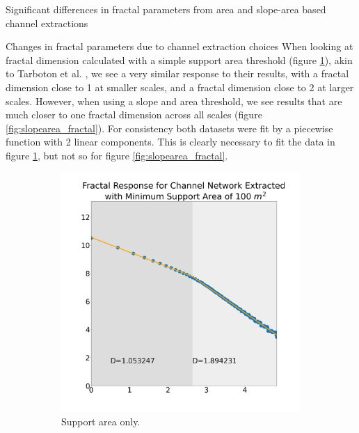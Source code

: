 \documentclass[final]{beamer}
\newlength{\colwidth}
\begin{document}
\begin{frame}[t]
\begin{columns}[t]
\begin{column}{\colwidth}
\begin{alertblock}{Significant differences in fractal parameters from area and slope-area based channel extractions}
  \end{alertblock}

  \begin{block}{Changes in fractal parameters due to channel extraction choices}
  When looking at fractal dimension calculated with a simple support area threshold (figure \ref{fig:area_fractal}), akin to Tarboton et al. \cite{tarboton1988fractal}, we see a very similar response to their results, with a fractal dimension close to 1 at smaller scales, and a fractal dimension close to 2 at larger scales.  However, when using a slope and area threshold, we see results that are much closer to one fractal dimension across all scales (figure \ref{fig:slopearea_fractal}).  For consistency both datasets were fit by a piecewise function with 2 linear components.  This is clearly necessary to fit the data in figure \ref{fig:area_fractal}, but not so for figure \ref{fig:slopearea_fractal}.
  \begin{figure}[ht]
  \begin{subfigure}{.45\textwidth}
      \centering
      \includegraphics[width=\textwidth]{area_fractal.png}
      \caption{Support area only.}
      \label{fig:area_fractal}
  \end{subfigure}
  \begin{subfigure}{.45\textwidth}

\end{subfigure}
\end{figure}
\end{block}
\end{column}
\end{columns}
\end{frame}
\end{document}
